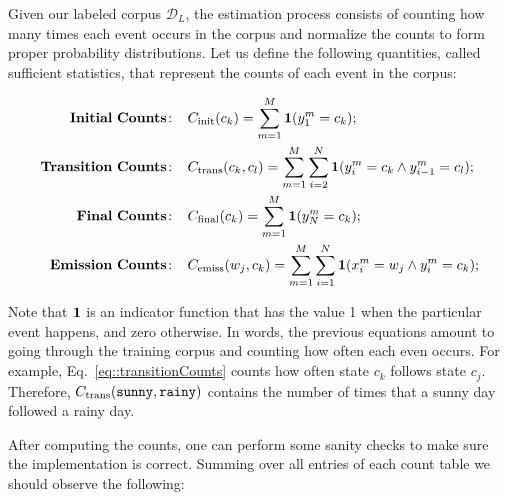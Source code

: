 Given our labeled corpus $\mathcal{D}_L$, the estimation process consists of counting how
many times each event occurs in the corpus and normalize the counts to
form proper probability distributions. Let us define the following
quantities, called sufficient statistics, that represent the counts of
each event in the corpus:

\begin{align}
\mathbf{Initial \ Counts\!:}\;\;\;\;  &  C_{\mathrm{init}}(c_k) = \sum_{m=1}^M
\Ind (y^m_1 = c_k); \label{eq::initialCounts}\\
%
%
\mathbf{Transition \ Counts\!:}\;\;\;\;  &  C_{\mathrm{trans}}(c_k,c_l) =
\sum_{m=1}^M  \sum_{i = 2}^{N}
\Ind (y^m_i = c_k \wedge y^m_{i-1} = c_l); \label{eq::transitionCounts}\\
%
\mathbf{Final \ Counts\!:}\;\;\;\;  &  C_{\mathrm{final}}(c_k) = \sum_{m=1}^M
\Ind (y^m_N = c_k); \label{eq::finalCounts}\\
%
\mathbf{Emission \ Counts\!:}\;\;\;\;  &  
C_{\mathrm{emiss}}(w_j,c_k) = \sum_{m=1}^M
\sum_{i = 1}^{N}
\Ind (x^m_i = w_j \wedge y^m_i = c_k); \label{eq::emissionCounts}
\end{align}

Note that $\textbf{1}$ is an indicator function that has the value 1 when the
particular event happens, and zero otherwise. In words, the previous
equations amount to going through the training corpus and counting how
often each even occurs. For example, Eq.~\ref{eq::transitionCounts} counts how often state $c_k$ follows state $c_j$. Therefore, $C_{\mathrm{trans}}(\text{\tt sunny},\text{\tt rainy})$ contains the number of times that a sunny day followed a rainy day.

%


After computing the counts, one can perform some sanity checks
to make sure the implementation is correct. Summing over all entries
of each count table we should observe the following:

